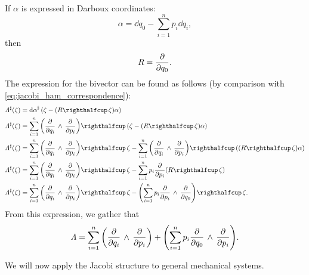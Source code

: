 If $\alpha$ is expressed in Darboux coordinates:
$$ \alpha = \dd{q}_0 - \sum^n_{i = 1} p_i\dd{q_i}, $$
then
$$ R = \pdv{}{q_0}.$$
The expression for the bivector can be found as follows (by comparison with \cref{eq:jacobi_ham_correspondence}):
\begin{equation}
    \begin{split}
        \fromDual{\Lambda}(\zeta) &= \fromDual{\dd{\alpha}}\qty(\zeta - (\intpr{R}{\zeta})\alpha) \\
        \fromDual{\Lambda}(\zeta) &= \intpr{\sum_{i=1}^n\qty(\wedgep{\pdv{}{q_i}}{\pdv{}{p_i}})}{(\zeta - (\intpr{R}{\zeta})\alpha)} \\
        \fromDual{\Lambda}(\zeta) &= \intpr{\sum_{i=1}^n\qty(\wedgep{\pdv{}{q_i}}{\pdv{}{p_i}})}{\zeta} 
                                     - \intpr{\sum_{i=1}^n\qty(\wedgep{\pdv{}{q_i}}{\pdv{}{p_i}})}{((\intpr{R}{\zeta})\alpha)} \\
        \fromDual{\Lambda}(\zeta) &= \intpr{\sum_{i=1}^n\qty(\wedgep{\pdv{}{q_i}}{\pdv{}{p_i}})}{\zeta} 
                                     - \sum_{i=1}^n p_i \pdv{}{p_i}(\intpr{R}{\zeta}) (\intpr{R}{\zeta})\\
        \fromDual{\Lambda}(\zeta) &= \intpr{\sum_{i=1}^n\qty(\wedgep{\pdv{}{q_i}}{\pdv{}{p_i}})}{\zeta} 
                                     - \intpr{\qty(\sum_{i=1}^n p_i \wedgep{\pdv{}{p_i}}{\pdv{}{q_0}})}{\zeta}. \\
    \end{split}
\end{equation}
From this expression, we gather that 
$$ \Lambda = \sum_{i=1}^n \qty( \pdv{}{q_i}\,\wedge\,\pdv{}{p_i} ) + \qty(\sum_{i=1}^n p_i  \pdv{}{q_0}\,\wedge\,\pdv{}{p_i} ).$$

We will now apply the Jacobi structure to general mechanical systems.

